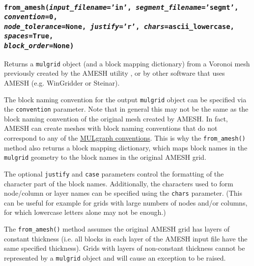 \begin{snugshade}\subsubsection{\texttt{from\_amesh(\emph{input\_filename}='in', \emph{segment\_filename}='segmt', \emph{convention}=0, \\
      \emph{node\_tolerance}=None, \emph{justify}='r', \emph{chars}=ascii\_lowercase, \emph{spaces}=\texttt{True},\\
      \emph{block\_order}=None)}}\end{snugshade}
\label{sec:mulgrid:from_amesh}

Returns a \texttt{mulgrid} object (and a block mapping dictionary) from a Voronoi mesh previously created by the AMESH utility \citep{AMESH}, or by other software that uses AMESH (e.g. WinGridder or Steinar).

The block naming convention for the output \texttt{mulgrid} object can be specified via the \texttt{convention} parameter. Note that in general this may not be the same as the block naming convention of the original mesh created by AMESH. In fact, AMESH can create meshes with block naming conventions that do not correspond to any of the \hyperref[tb:mulgrid_conventions]{MULgraph conventions}. This is why the \texttt{from\_amesh()} method also returns a block mapping dictionary, which maps block names in the \texttt{mulgrid} geometry to the block names in the original AMESH grid.

The optional \texttt{justify} and \texttt{case} parameters control the formatting of the character part of the block names.  Additionally, the characters used to form node/column or layer names can be specified using the \texttt{chars} parameter.  (This can be useful for example for grids with large numbers of nodes and/or columns, for which lowercase letters alone may not be enough.)

The \texttt{from\_amesh()} method assumes the original AMESH grid has layers of constant thickness (i.e. all blocks in each layer of the AMESH input file have the same specified thickness). Grids with layers of non-constant thickness cannot be represented by a \texttt{mulgrid} object and will cause an exception to be raised.

